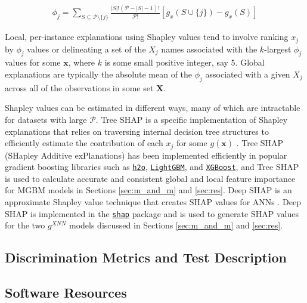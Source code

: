 \documentclass[information,article,submit,moreauthors,pdftex]{definitions/mdpi}
\begin{document}
\begin{equation}
\label{eq:shap_contrib}
\begin{aligned}
\phi_{j} = \sum_{S \subseteq \mathcal{P} \setminus \{j\}}\frac{|S|!(\mathcal{P} -|S| -1)!}{\mathcal{P}!}[g_x(S \cup \{j\}) - g_x(S)]
\end{aligned}
\end{equation}

\noindent Local, per-instance explanations using Shapley values tend to involve ranking $x_j$ by $\phi_j$ values or delineating a set of the $X_j$ names associated with the $k$-largest $\phi_j$ values for some $\mathbf{x}$, where $k$ is some small positive integer, say 5. Global explanations are typically the absolute mean of the $\phi_j$ associated with a given $X_j$ across all of the observations in some set $\mathbf{X}$.

Shapley values can be estimated in different ways, many of which are intractable for datasets with large $\mathcal{P}$. Tree SHAP is a specific implementation of Shapley explanations that relies on traversing internal decision tree structures to efficiently estimate the contribution of each $x_j$ for some $g(\mathbf{x})$ \cite{tree_shap}. Tree SHAP (SHapley Additive exPlanations) has been implemented efficiently in popular gradient boosting libraries such as \href{http://docs.h2o.ai/h2o/latest-stable/h2o-py/docs/modeling.html#h2ogradientboostingestimator}{\texttt{h2o}}, \href{https://lightgbm.readthedocs.io/en/latest/Python-Intro.html}{\texttt{LightGBM}}, and \href{https://xgboost.readthedocs.io/en/latest/python/python_intro.html}{\texttt{XGBoost}}, and Tree SHAP is used to calculate accurate and consistent global and local feature importance for MGBM models in Sections \ref{sec:m_and_m} and \ref{sec:res}. Deep SHAP is an approximate Shapley value technique that creates SHAP values for ANNs \cite{shapley}. Deep SHAP is implemented in the \href{https://github.com/slundberg/shap}{\texttt{shap}} package and is used to generate SHAP values for the two $g^{XNN}$ models discussed in Sections \ref{sec:m_and_m} and \ref{sec:res}.

\subsection{Discrimination Metrics and Test Description}\label{ssec:di}

\subsection{Software Resources}\label{ssec:soft}
\end{document}
